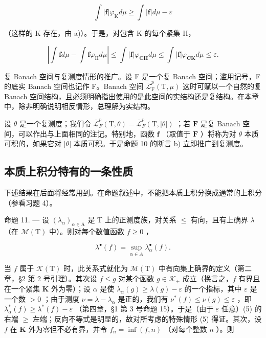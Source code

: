 \[
\int | \mathbf {f} | \varphi_ {\mathrm{K}} d \mu \geqslant \int | \mathbf {f} | d \mu - \varepsilon
\]

（这样的 K 存在，由 a)）。于是，对包含 K 的每个紧集 H，

\[
\left| \int \mathbf {f} d \mu - \int \mathbf {f} \varphi_ {\mathrm{H}} d \mu \right| \leqslant \int | \mathbf {f} | \varphi_ {\mathbf {C H}} d \mu \leqslant \int | \mathbf {f} | \varphi_ {\mathbf {C K}} d \mu \leqslant \varepsilon .
\]

复 Banach 空间与复测度情形的推广。设 F 是一个复 Banach 空间；滥用记号，F 的底实 Banach 空间也记作 F。Banach 空间 \(\overline{\mathcal{L}}_{\mathrm{F}}^{p}(\mathrm{T},\mu)\) 这时可赋以一个自然的复 Banach 空间结构，且必须明确指出使用的是此空间的实结构还是复结构。在本章中，除非明确说明相反情形，总理解为实结构。

设 \(\theta\) 是一个复测度；我们令 \(\overline{\mathcal{L}}_F^p (\mathrm{T},\theta) = \overline{\mathcal{L}}_F^p (\mathrm{T},|\theta |)\) ；若 \(\mathbf{F}\) 是复 Banach 空间，可以作出与上面相同的注记。特别地，函数 \(\mathbf{f}\) （取值于 \(\mathbf{F}\) ）将称为对 \(\theta\) 本质可积的，如果它对 \(|\theta |\) 本质可积。于是命题 10 的断言 b) 立即推广到复测度。

\subsection{本质上积分特有的一条性质}

下述结果在后面将经常用到。在命题叙述中，不能把本质上积分换成通常的上积分（参看习题 4）。

命题 11. --- 设 \((\lambda_{\alpha})_{\alpha\in\mathrm{A}}\) 是 T 上的正测度族，对关系 \(\leqslant\) 有向，且有上确界 \(\lambda\) （在 \(\mathcal{M}(\mathrm{T})\) 中）。则对每个数值函数 \(f\geqslant0\) ，

\[
\lambda^ {\bullet} (f) = \sup _ {\alpha \in A} \lambda_ {\alpha} ^ {\bullet} (f).\tag{5}
\]

当 \(f\) 属于 \(\mathcal{K}(\mathrm{T})\) 时，此关系式就化为 \(\mathcal{M}(\mathrm{T})\) 中有向集上确界的定义（第二章，§2 第 2 号引理）。其次设 \(f \leqslant g\) 对某个函数 \(g \in \mathcal{K}_+\) 成立（换言之，\(f\) 有界且在一个紧集 \(\mathbf{K}\) 外为零）；设 \(\alpha\) 是使 \(\lambda_{\alpha}(g) \geqslant \lambda(g) - \varepsilon\) 的一个指标，其中 \(\varepsilon\) 是一个数 \(>0\) ；由于测度 \(\nu = \lambda - \lambda_{\alpha}\) 是正的，我们有 \(\nu^{*}(f) \leqslant \nu(g) \leqslant \varepsilon\) ，即 \(\lambda_{\alpha}^{*}(f) \geqslant \lambda^{*}(f) - \varepsilon\) （第四章，§1 第 3 号命题 15）。于是（由于 \(\varepsilon\) 任意）(5) 的右端 \(\geqslant\) 左端；反向不等式是明显的，故对所考虑的特殊情形 (5) 得证。其次，设 \(f\) 在 \(\mathbf{K}\) 外为零但不必有界，并令 \(f_n = \inf(f, n)\) （对每个整数 \(n\) ）。则

